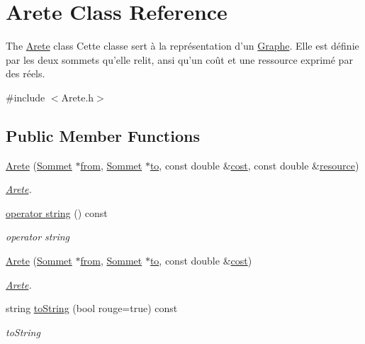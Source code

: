 \hypertarget{class_arete}{\section{Arete Class Reference}
\label{class_arete}
}


The \hyperlink{class_arete}{Arete} class Cette classe sert à la représentation d'un \hyperlink{class_graphe}{Graphe}. Elle est définie par les deux sommets qu'elle relit, ansi qu'un coût et une ressource exprimé par des réels.  




{\ttfamily \#include $<$Arete.\+h$>$}

\subsection*{Public Member Functions}
\begin{DoxyCompactItemize}
\item 
\hyperlink{class_arete_acdc3cd559c105c002ad10e66a2641ca9}{Arete} (\hyperlink{class_sommet}{Sommet} $\ast$\hyperlink{class_arete_abe2d1eac01195690e46bf61faab9493b}{from}, \hyperlink{class_sommet}{Sommet} $\ast$\hyperlink{class_arete_ae260ae83d6bbaaaf5547107fc40fec49}{to}, const double \&\hyperlink{class_arete_a082c784fbf985a8a991f3c035308fc0c}{cost}, const double \&\hyperlink{class_arete_a2f4d932778ea005c550473b39c5d7221}{resource})
\begin{DoxyCompactList}\small\item\em \hyperlink{class_arete}{Arete}. \end{DoxyCompactList}\item 
\hyperlink{class_arete_a27274ab782a462895e8218f41e957323}{operator string} () const 
\begin{DoxyCompactList}\small\item\em operator string \end{DoxyCompactList}\item 
\hyperlink{class_arete_ac557e81c9b02f266cadd55fd2952f377}{Arete} (\hyperlink{class_sommet}{Sommet} $\ast$\hyperlink{class_arete_abe2d1eac01195690e46bf61faab9493b}{from}, \hyperlink{class_sommet}{Sommet} $\ast$\hyperlink{class_arete_ae260ae83d6bbaaaf5547107fc40fec49}{to}, const double \&\hyperlink{class_arete_a082c784fbf985a8a991f3c035308fc0c}{cost})
\begin{DoxyCompactList}\small\item\em \hyperlink{class_arete}{Arete}. \end{DoxyCompactList}\item 
string \hyperlink{class_arete_af0a0e602373b28c3eb298ffd95c23aca}{to\+String} (bool rouge=true) const 
\begin{DoxyCompactList}\small\item\em to\+String \end{DoxyCompactList}\end{DoxyCompactItemize}
